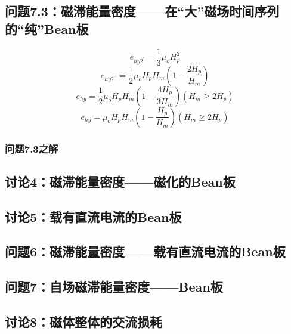 \subsection{问题7.3：磁滞能量密度——在“大”磁场时间序列的“纯”Bean板}

\begin{equation}%
e_{hy2^\prime}=\frac{1}{3}\mu_oH_{p}^{2}
\end{equation}
\begin{equation}%
e_{hy2^{\prime\prime}}=\frac{1}{2}\mu_oH_pH_m\left(1-\frac{2H_p}{H_m}\right)
\end{equation}
\begin{equation}%
e_{hy}=\frac{1}{2}\mu_oH_pH_m\left(1-\frac{4H_p}{3H_m}\right)     (H_m\geq 2H_p)
\end{equation}
\begin{equation}%
e_{hy}=\mu_oH_pH_m\left(1-\frac{H_p}{H_m}\right)      (H_m\geq 2H_p)
\end{equation}

\subsubsection{问题7.3之解}






\newpage
\subsection{讨论4：磁滞能量密度——磁化的Bean板}

\newpage
\subsection{讨论5：载有直流电流的Bean板}

\newpage
\subsection{问题6：磁滞能量密度——载有直流电流的Bean板}

\newpage
\subsection{问题7：自场磁滞能量密度——Bean板}

\newpage
\subsection{讨论8：磁体整体的交流损耗}

